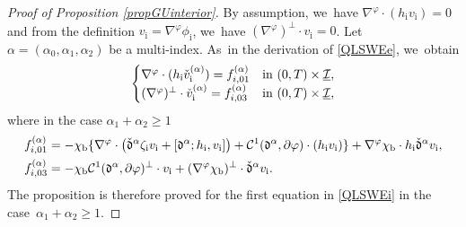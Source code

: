 \documentclass[11pt]{article}
\newcommand{\cI}{{\mathcal I}}
\newcommand{\ul}[1]{\underline{#1}}
\newcommand{\cmfalpha}{\check{\mathfrak{d}}^{\alpha}}
\theoremstyle{definition}
\begin{document}
\begin{proof}[Proof of Proposition \ref{propGUinterior}]
By assumption, we~have $\nabla^{\varphi}\cdot(h_\mathrm{i}v_\mathrm{i})=0$ and from the definition $v_\mathrm{i}=\nabla^\varphi \phi_\mathrm{i}$, we~have $(\nabla^\varphi)^\perp\cdot v_\mathrm{i}=0$.
Let $\alpha=(\alpha_0,\alpha_1,\alpha_2)$ be a multi-index. As~in the derivation of \eqref{QLSWEe}, we~obtain
\begin{equation}\label{preQLSWEi0}
\begin{cases}
\nabla^\varphi\cdot(h_\mathrm{i}\check{v}_\mathrm{i}^{(\alpha)}) = f_{{\rm i},01}^{(\alpha)} &\text{in } (0,T)\times\ul{\cI}, \\
(\nabla^\varphi)^\perp\cdot\check{v}_\mathrm{i}^{(\alpha)} = f_{{\rm i},03}^{(\alpha)} &\text{in } (0,T)\times\ul{\cI},
\end{cases}
\end{equation}
where in the case $\alpha_1+\alpha_2\geq1$
\begin{align}
\label{deffi01}
f_{{\rm i},01}^{(\alpha)}
&= -\chi_\mathrm{b}\{ \nabla^\varphi\cdot\bigl(\cmfalpha\zeta_\mathrm{i} v_\mathrm{i}
+ [\mathfrak{d}^\alpha;h_\mathrm{i},v_\mathrm{i}] \bigr)
+ {\mathcal C}^1(\mathfrak{d}^\alpha,\partial\varphi)\cdot(h_\mathrm{i}v_\mathrm{i}) \}
+ \nabla^\varphi\chi_\mathrm{b}\cdot h_\mathrm{i} \cmfalpha v_\mathrm{i} , \\
\label{deffi03}
f_{{\rm i},03}^{(\alpha)}
&= -\chi_\mathrm{b} {\mathcal C}^1(\mathfrak{d}^\alpha,\partial\varphi)^\perp\cdot v_\mathrm{i}
+ (\nabla^\varphi\chi_\mathrm{b})^\perp\cdot \cmfalpha v_\mathrm{i}.
\end{align}
The proposition is therefore proved for the first equation in \eqref{QLSWEi} in the case~\hbox{$\alpha_1\!+\!\alpha_2\!\geq\! 1$}.


\end{proof}
\end{document}
